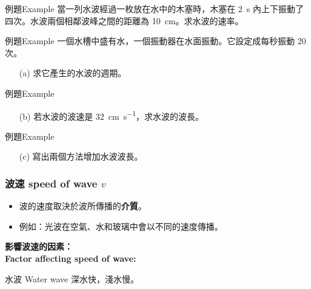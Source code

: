 \documentclass[beamer=true]{standalone}
\begin{document}
\begin{frame}[t]{例題Example}
    當一列水波經過一枚放在水中的木塞時，木塞在 \qty{2}{s} 內上下振動了四次。水波兩個相鄰波峰之間的距離為 \qty{10}{cm}。求水波的速率。
\end{frame}

\begin{frame}[t]{例題Example}
    一個水槽中盛有水，一個振動器在水面振動。它設定成每秒振動 20 次。
    \begin{itemize}
        \item [(a)] 求它產生的水波的週期。
    \end{itemize}
\end{frame}

\begin{frame}[t]{例題Example}
    \begin{itemize}
        \item [(b)] 若水波的波速是 \qty{32}{cm.s^{-1}}，求水波的波長。
    \end{itemize}
\end{frame}

\begin{frame}[t]{例題Example}
    \begin{itemize}
        \item [(c)] 寫出兩個方法增加水波波長。
    \end{itemize}
\end{frame}




\begin{frame}
    \frametitle{波速 speed of wave $v$}
    \begin{itemize}
        \item 波的速度取決於波所傳播的\textbf{介質}。
        \item 例如：光波在空氣、水和玻璃中會以不同的速度傳播。
    \end{itemize}
    \bigskip \bigskip
    \textbf{影響波速的因素：\\Factor affecting speed of wave:}
    \begin{exampleblock}{水波 Water wave}
        深水快，淺水慢。
    \end{exampleblock}

\end{frame}
\end{document}
